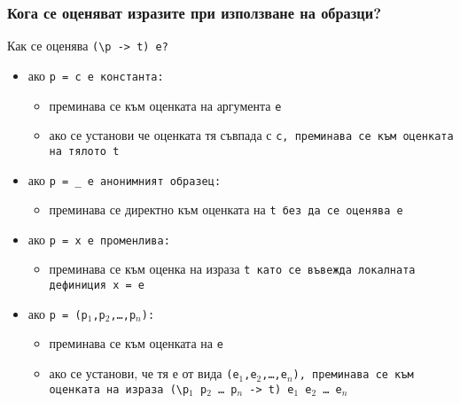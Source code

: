 \documentclass{beamer}
\begin{document}
\begin{frame}
  \frametitle{Кога се оценяват изразите при използване на образци?}
  Как се оценява \tt{(\textbackslash p -> t) e}?\pause
  \begin{itemize}[<+->]
  \item ако \tt{p = c} е константа:
    \begin{itemize}
    \item преминава се към оценката на аргумента \tt e
    \item ако се установи че оценката тя съвпада с \tt c, преминава се към оценката на тялото \tt t
    \end{itemize}
  \item ако \tt{p = \_} е анонимният образец:
    \begin{itemize}
    \item преминава се директно към оценката на \tt t \alert{без да се оценява \tt e}
    \end{itemize}
  \item ако \tt{p = x} е променлива:
    \begin{itemize}
    \item преминава се към оценка на израза \tt t \alert{като се въвежда локалната дефиниция \tt{x = e}}
    \end{itemize}
  \item ако \tt{p = (p$_1$,p$_2$,\ldots,p$_n$)}:
    \begin{itemize}
    \item преминава се към оценката на \tt e
    \item ако се установи, че тя е от вида \tt{(e$_1$,e$_2$,\ldots,e$_n$)}, преминава се към оценката на израза \tt{(\textbackslash p$_1$ p$_2$ \ldots\ p$_n$ -> t) e$_1$ e$_2$ \ldots\ e$_n$}
    \end{itemize}
  \end{itemize}
\end{frame}
\end{document}
